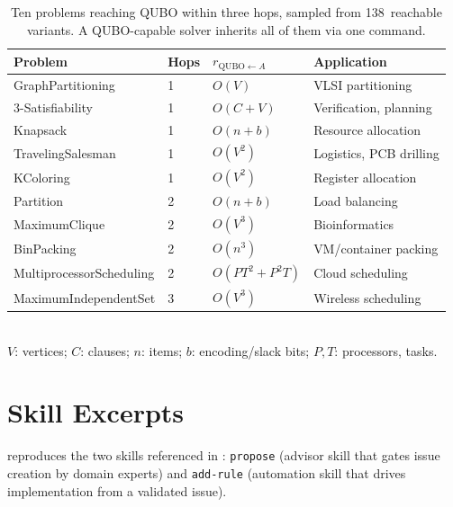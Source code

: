 \documentclass{article}
\begin{document}
\begin{table}[htbp]
\caption{Ten problems reaching QUBO within three hops, sampled from 138~reachable variants. A QUBO-capable solver inherits all of them via one command.}
\label{tab:qubo-coverage}
\centering
\small
\begin{tabular}{@{}llll@{}}
\toprule
Problem & Hops & $r_{\text{QUBO} \leftarrow A}$ & Application \\
\midrule
GraphPartitioning           & 1 & $O(V)$              & VLSI partitioning \\
3-Satisfiability            & 1 & $O(C + V)$          & Verification, planning \\
Knapsack                    & 1 & $O(n + b)$          & Resource allocation \\
TravelingSalesman           & 1 & $O(V^2)$            & Logistics, PCB drilling \\
KColoring                   & 1 & $O(V^2)$            & Register allocation \\
Partition                   & 2 & $O(n + b)$          & Load balancing \\
MaximumClique               & 2 & $O(V^3)$            & Bioinformatics \\
BinPacking                  & 2 & $O(n^3)$            & VM/container packing \\
MultiprocessorScheduling    & 2 & $O(P T^2 + P^2 T)$  & Cloud scheduling \\
MaximumIndependentSet       & 3 & $O(V^3)$            & Wireless scheduling \\
\bottomrule
\end{tabular}
\\[2pt]
{\footnotesize $V$: vertices; $C$: clauses; $n$: items; $b$: encoding/slack bits; $P, T$: processors, tasks.}
\end{table}

\section{Skill Excerpts}\label{app:skills}

 reproduces the two skills referenced in : \texttt{propose} (advisor skill that gates issue creation by domain experts) and \texttt{add-rule} (automation skill that drives implementation from a validated issue).
\end{document}
